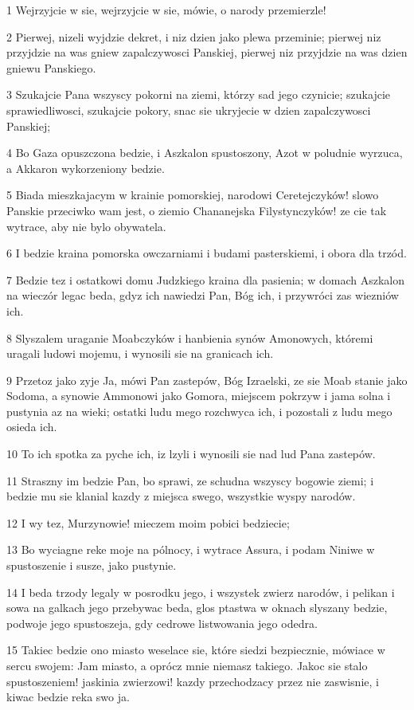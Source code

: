 \par 1 Wejrzyjcie w sie, wejrzyjcie w sie, mówie, o narody przemierzle!
\par 2 Pierwej, nizeli wyjdzie dekret, i niz dzien jako plewa przeminie; pierwej niz przyjdzie na was gniew zapalczywosci Panskiej, pierwej niz przyjdzie na was dzien gniewu Panskiego.
\par 3 Szukajcie Pana wszyscy pokorni na ziemi, którzy sad jego czynicie; szukajcie sprawiedliwosci, szukajcie pokory, snac sie ukryjecie w dzien zapalczywosci Panskiej;
\par 4 Bo Gaza opuszczona bedzie, i Aszkalon spustoszony, Azot w poludnie wyrzuca, a Akkaron wykorzeniony bedzie.
\par 5 Biada mieszkajacym w krainie pomorskiej, narodowi Ceretejczyków! slowo Panskie przeciwko wam jest, o ziemio Chananejska Filystynczyków! ze cie tak wytrace, aby nie bylo obywatela.
\par 6 I bedzie kraina pomorska owczarniami i budami pasterskiemi, i obora dla trzód.
\par 7 Bedzie tez i ostatkowi domu Judzkiego kraina dla pasienia; w domach Aszkalon na wieczór legac beda, gdyz ich nawiedzi Pan, Bóg ich, i przywróci zas wiezniów ich.
\par 8 Slyszalem uraganie Moabczyków i hanbienia synów Amonowych, któremi uragali ludowi mojemu, i wynosili sie na granicach ich.
\par 9 Przetoz jako zyje Ja, mówi Pan zastepów, Bóg Izraelski, ze sie Moab stanie jako Sodoma, a synowie Ammonowi jako Gomora, miejscem pokrzyw i jama solna i pustynia az na wieki; ostatki ludu mego rozchwyca ich, i pozostali z ludu mego osieda ich.
\par 10 To ich spotka za pyche ich, iz lzyli i wynosili sie nad lud Pana zastepów.
\par 11 Straszny im bedzie Pan, bo sprawi, ze schudna wszyscy bogowie ziemi; i bedzie mu sie klanial kazdy z miejsca swego, wszystkie wyspy narodów.
\par 12 I wy tez, Murzynowie! mieczem moim pobici bedziecie;
\par 13 Bo wyciagne reke moje na pólnocy, i wytrace Assura, i podam Niniwe w spustoszenie i susze, jako pustynie.
\par 14 I beda trzody legaly w posrodku jego, i wszystek zwierz narodów, i pelikan i sowa na galkach jego przebywac beda, glos ptastwa w oknach slyszany bedzie, podwoje jego spustoszeja, gdy cedrowe listwowania jego odedra.
\par 15 Takiec bedzie ono miasto weselace sie, które siedzi bezpiecznie, mówiace w sercu swojem: Jam miasto, a oprócz mnie niemasz takiego. Jakoc sie stalo spustoszeniem! jaskinia zwierzowi! kazdy przechodzacy przez nie zaswisnie, i kiwac bedzie reka swo ja.

